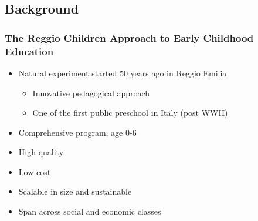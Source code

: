 \documentclass{beamer}
\begin{document}
\subsection{Background}\label{sec:Back}
\begin{frame}
\frametitle{The Reggio Children Approach to Early Childhood Education} 
\begin{itemize}
	\item Natural experiment started 50 years ago in Reggio Emilia
	\begin{itemize}
		\item Innovative pedagogical approach %
		\item One of the first public preschool in Italy (post WWII)
	\end{itemize}
	\item Comprehensive program, age 0-6 
	\item High-quality 
	\item Low-cost
	\item Scalable in size and sustainable
	\item Span across social and economic classes
\end{itemize}
\end{frame} 
\end{document}
